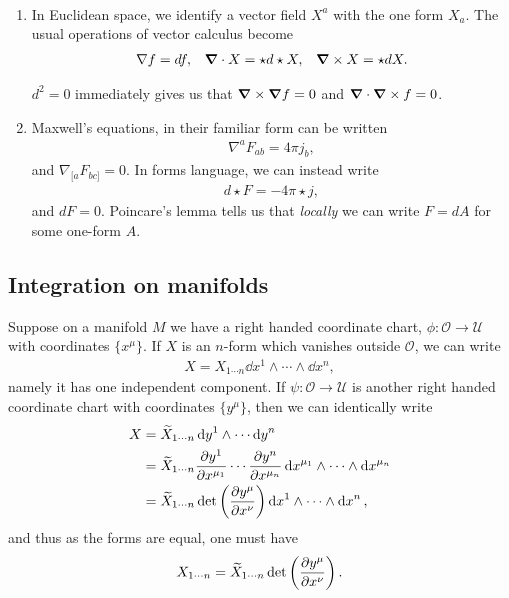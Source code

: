 \begin{examples}~
    \begin{enumerate}
        \item In Euclidean space, we identify a vector field $X^{a}$ with the one form $X_a$. The usual operations of vector calculus become
            \begin{align}
                \nabla f = df, && \grad \cdot X = \star d \star X, && \grad \times X = \star d X
            .\end{align}
            \begin{note}
                $d^2 = 0$ immediately gives us that $\grad \times \grad f = 0$ and $\grad \cdot \grad \times f = 0$.
            \end{note}
         \item Maxwell's equations, in their familiar form can be written
             \begin{align}
                 \nabla^{a} F_{ab} = 4\pi j_b
             ,\end{align}
             and $\nabla_{[a} F_{bc]} = 0$. In forms language, we can instead write
             \begin{align}
                 d \star F = - 4\pi \star j
             ,\end{align}
             and $dF = 0$.
             Poincare's lemma tells us that \textit{locally} we can write $F = d A$ for some one-form $A$.
    \end{enumerate}
\end{examples}  

\subsection{Integration on manifolds}

Suppose on a manifold $M$ we have a right handed coordinate chart, $\phi : \mathcal{O} \to \mathcal{U}$ with coordinates $\{x^{\mu}\}$. If $X$ is an $n$-form which vanishes outside $\mathcal{O}$, we can write
\begin{align}
    X = X_{1 \cdots n} \dd{x}^{1} \wedge \cdots \wedge \dd{x}^{n}
,\end{align}
namely it has one independent component. If $\psi : \mathcal{O} \to \mathcal{U}$ is another right handed coordinate chart with coordinates $\{y^{\mu}\} $, then we can identically write
\begin{align}
    X &= \widetilde{X}_{1 \cdots n} \dd{y}^{1} \wedge \cdots \dd{y}^{n} \\
    &= \widetilde{X}_{1 \cdots n} \pdv{y^{1}}{x^{\mu_1}} \cdots \pdv{y^{n}}{x^{\mu_n}} \dd{x^{\mu_1}} \wedge \cdots \wedge \dd{x^{\mu_n}} \\
    &= \widetilde{X}_{1 \cdots n} \det \left( \pdv{y^{\mu}}{x^{\nu}} \right) \dd{x}^{1} \wedge \cdots \wedge \dd{x}^{n} 
,\end{align}
and thus as the forms are equal, one must have
\begin{align}
    X_{1 \cdots n} = \widetilde{X}_{1 \cdots n} \det \left( \pdv{y^{\mu}}{x^{\nu}} \right) 
.\end{align}

